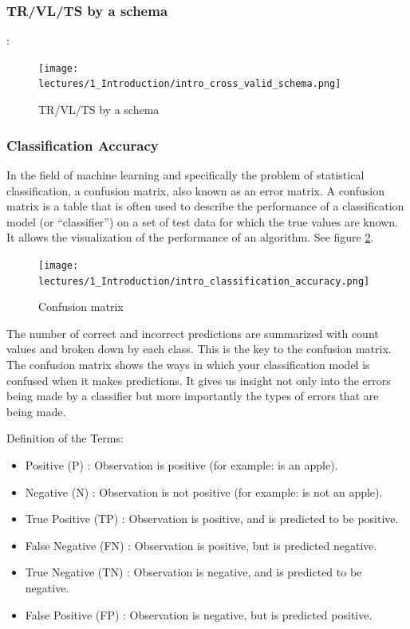 \documentclass[../main.tex]{subfiles}
\begin{document}
\subsubsection{TR/VL/TS by a schema}:
\begin{figure}[H]
    \centering
    \texttt{[image: lectures/1\_Introduction/intro\_cross\_valid\_schema.png]}
    \caption{TR/VL/TS by a schema}
    \label{fig:intro_cross_valid_schema}
\end{figure}

\subsubsection{Classification Accuracy}
In the field of machine learning and specifically the problem of statistical classification, a confusion matrix, also known as an error matrix.
A confusion matrix is a table that is often used to describe the performance of a classification model (or “classifier”) on a set of test data for which the true values are known. It allows the visualization of the performance of an algorithm. See figure \ref{fig:Confusion matrix}.

\begin{figure}[H]
    \centering
    \texttt{[image: lectures/1\_Introduction/intro\_classification\_accuracy.png]}
    \caption{Confusion matrix}
    \label{fig:Confusion matrix}
\end{figure}
The number of correct and incorrect predictions are summarized with count values and broken down by each class. This is the key to the confusion matrix.
The confusion matrix shows the ways in which your classification model is confused when it makes predictions.
It gives us insight not only into the errors being made by a classifier but more importantly the types of errors that are being made.

Definition of the Terms:
\begin{itemize}
    \item Positive (P) : Observation is positive (for example: is an apple).
    \item Negative (N) : Observation is not positive (for example: is not an apple).
    \item True Positive (TP) : Observation is positive, and is predicted to be positive.
    \item False Negative (FN) : Observation is positive, but is predicted negative.
    \item True Negative (TN) : Observation is negative, and is predicted to be negative.
    \item False Positive (FP) : Observation is negative, but is predicted positive.
\end{itemize}
\end{document}
